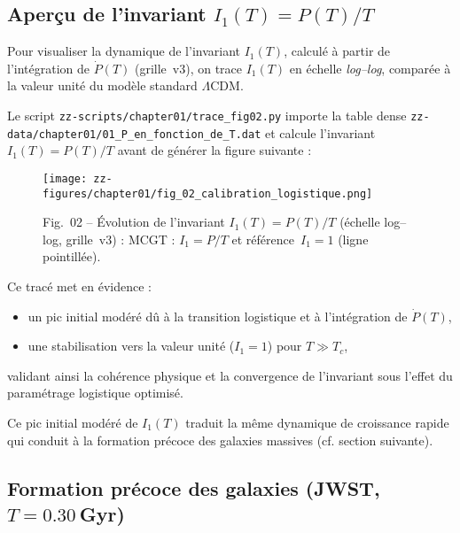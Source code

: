 \subsection{Aperçu de l’invariant \(I_{1}(T)=P(T)/T\)}

Pour visualiser la dynamique de l’invariant \(I_{1}(T)\), calculé à partir de l’intégration de \(\dot P(T)\) (grille~v3), on trace \(I_{1}(T)\) en échelle \emph{log–log}, comparée à la valeur unité du modèle standard \(\Lambda\mathrm{CDM}\).

Le script \texttt{zz-scripts/chapter01/trace\_fig02.py} importe la table dense
\texttt{zz-data/chapter01/01\_P\_en\_fonction\_de\_T.dat} et calcule
l’invariant \(I_{1}(T)=P(T)/T\) avant de générer la figure suivante :

\begin{figure}[htbp]
  \centering
  \texttt{[image: zz-figures/chapter01/fig\_02\_calibration\_logistique.png]}
  \caption{Fig.~02 – Évolution de l’invariant \(I_{1}(T)=P(T)/T\) (échelle log–log, grille~v3) :
           MCGT : \(I_{1}=P/T\) et référence \(\,I_{1}=1\) (ligne pointillée).}
  \label{fig:ratio_PT_log}
\end{figure}

Ce tracé met en évidence :
\begin{itemize}
  \item un pic initial modéré dû à la transition logistique et à l’intégration de \(\dot P(T)\),
  \item une stabilisation vers la valeur unité (\(I_{1}=1\)) pour \(T\gg T_{c}\),
\end{itemize}
validant ainsi la cohérence physique et la convergence de l’invariant sous l’effet du paramétrage logistique optimisé.

Ce pic initial modéré de \(I_{1}(T)\) traduit la même dynamique de croissance rapide
qui conduit à la formation précoce des galaxies massives (cf. section suivante).

\subsection{Formation précoce des galaxies (JWST, \(T=0.30\) Gyr)}

